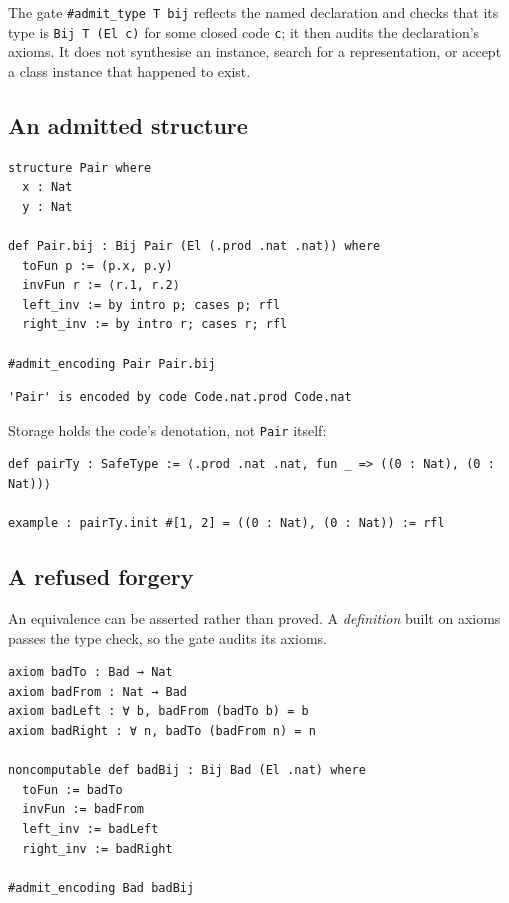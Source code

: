\documentclass[10pt,a4paper]{article}
\newcommand{\file}[1]{\texttt{\small #1}}
\begin{document}
The gate \texttt{\#admit\_type T bij} reflects the named declaration and checks
that its type is \texttt{Bij T (El c)} for some closed code \texttt{c}; it then
audits the declaration's axioms. It does not synthesise an instance, search for a
representation, or accept a class instance that happened to exist.

\subsection*{An admitted structure}

\begin{lstlisting}[caption={\file{bench/AdmissionAccept.lean}: the user's bijection to \texttt{Nat × Nat}.}]
structure Pair where
  x : Nat
  y : Nat

def Pair.bij : Bij Pair (El (.prod .nat .nat)) where
  toFun p := (p.x, p.y)
  invFun r := ⟨r.1, r.2⟩
  left_inv := by intro p; cases p; rfl
  right_inv := by intro r; cases r; rfl

#admit_encoding Pair Pair.bij
\end{lstlisting}

\begin{lstlisting}[style=out]
'Pair' is encoded by code Code.nat.prod Code.nat
\end{lstlisting}

Storage holds the code's denotation, not \texttt{Pair} itself:

\begin{lstlisting}[caption={The allocator applies \texttt{new} against a fresh allocation's bytes; the stored value is \texttt{El code}.}]
def pairTy : SafeType := ⟨.prod .nat .nat, fun _ => ((0 : Nat), (0 : Nat))⟩

example : pairTy.init #[1, 2] = ((0 : Nat), (0 : Nat)) := rfl
\end{lstlisting}

\subsection*{A refused forgery}

An equivalence can be asserted rather than proved. A \emph{definition} built on
axioms passes the type check, so the gate audits its axioms.

\begin{lstlisting}[caption={\file{bench/AdmissionReject.lean}.}]
axiom badTo : Bad → Nat
axiom badFrom : Nat → Bad
axiom badLeft : ∀ b, badFrom (badTo b) = b
axiom badRight : ∀ n, badTo (badFrom n) = n

noncomputable def badBij : Bij Bad (El .nat) where
  toFun := badTo
  invFun := badFrom
  left_inv := badLeft
  right_inv := badRight

#admit_encoding Bad badBij
\end{lstlisting}
\end{document}
